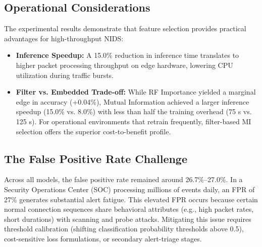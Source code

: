 \documentclass[conference]{IEEEtran}
\begin{document}
\subsection{Operational Considerations}
The experimental results demonstrate that feature selection provides practical advantages for high-throughput NIDS:
\begin{itemize}
    \item \textbf{Inference Speedup:} A 15.0\% reduction in inference time translates to higher packet processing throughput on edge hardware, lowering CPU utilization during traffic bursts.
    \item \textbf{Filter vs. Embedded Trade-off:} While RF Importance yielded a marginal edge in accuracy (+0.04\%), Mutual Information achieved a larger inference speedup (15.0\% vs. 8.0\%) with less than half the training overhead (75 s vs. 125 s). For operational environments that retrain frequently, filter-based MI selection offers the superior cost-to-benefit profile.
\end{itemize}

\subsection{The False Positive Rate Challenge}
Across all models, the false positive rate remained around 26.7\%--27.0\%. In a Security Operations Center (SOC) processing millions of events daily, an FPR of 27\% generates substantial alert fatigue. This elevated FPR occurs because certain normal connection sequences share behavioral attributes (e.g., high packet rates, short durations) with scanning and probe attacks. Mitigating this issue requires threshold calibration (shifting classification probability thresholds above 0.5), cost-sensitive loss formulations, or secondary alert-triage stages.
\end{document}
